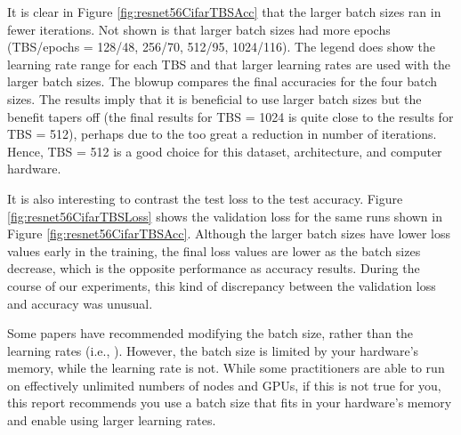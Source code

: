 \documentclass{article} %
\begin{document}
It is clear in Figure \ref{fig:resnet56CifarTBSAcc} that the larger batch sizes ran in fewer iterations.  Not shown is that larger batch sizes had more epochs (TBS/epochs = 128/48, 256/70, 512/95, 1024/116).  The legend does show the learning rate range for each TBS and that larger learning rates are used with the larger batch sizes.  The blowup compares the final accuracies for the four batch sizes.  The results imply that it is beneficial to use larger batch sizes but the benefit tapers off (the final results for TBS = 1024 is quite close to the results for TBS = 512), perhaps due to the too great a reduction in number of iterations. Hence, TBS = 512 is a good choice for this dataset, architecture, and computer hardware.   

It is also interesting to contrast the test loss to the test accuracy.  Figure \ref{fig:resnet56CifarTBSLoss} shows the validation loss for the same runs shown in Figure \ref{fig:resnet56CifarTBSAcc}.  Although the larger batch sizes have lower loss values early in the training, the final loss values are lower as the batch sizes decrease, which is the opposite performance as accuracy results.  During the course of our experiments, this kind of discrepancy between the validation loss and accuracy was unusual. 
 
Some papers have recommended modifying the batch size, rather than the learning rates (i.e., \cite{smith2017don,jastrzkebski2017three}).  However, the batch size is limited by your hardware's memory, while the learning rate is not.  While some practitioners are able to run on effectively unlimited numbers of nodes and GPUs, if this is not true for you, this report recommends you use a batch size that fits in your hardware's memory and enable using larger learning rates.  
\end{document}
